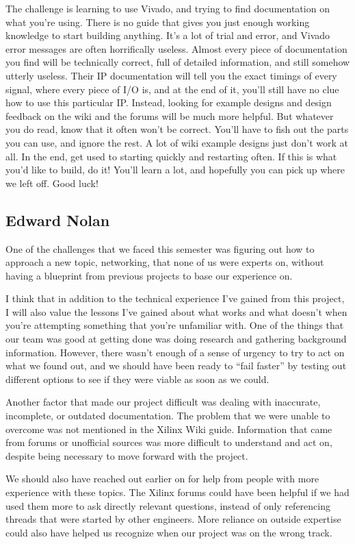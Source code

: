 \documentclass[12pt]{report}
\begin{document}
The challenge is learning to use Vivado, and trying to find documentation on what you're using. There is no guide that gives you just enough working knowledge to start building anything. It's a lot of trial and error, and Vivado error messages are often horrifically useless.
Almost every piece of documentation you find will be technically correct, full of detailed information, and still somehow utterly useless.
Their IP documentation will tell you the exact timings of every signal, where every piece of I/O is, and at the end of it, you'll still have no clue how to use this particular IP. Instead, looking for example designs and design feedback on the wiki and the forums will be much more helpful. But whatever you do read, know that it often won't be correct. You'll have to fish out the parts you can use, and ignore the rest. A lot of wiki example designs just don't work at all. In the end, get used to starting quickly and restarting often. If this is what you'd like to build, do it! You'll learn a lot, and hopefully you can pick up where we left off. Good luck!

\subsection{Edward Nolan}
One of the challenges that we faced this semester was figuring out how to approach a new topic, networking, that none of us were experts on, without having a blueprint from previous projects to base our experience on.

I think that in addition to the technical experience I've gained from this project, I will also value the lessons I've gained about what works and what doesn't when you're attempting something that you're unfamiliar with. One of the things that our team was good at getting done was doing research and gathering background information. However, there wasn't enough of a sense of urgency to try to act on what we found out, and we should have been ready to ``fail faster'' by testing out different options to see if they were viable as soon as we could.

Another factor that made our project difficult was dealing with inaccurate, incomplete, or outdated documentation. The problem that we were unable to overcome was not mentioned in the Xilinx Wiki guide. Information that came from forums or unofficial sources was more difficult to understand and act on, despite being necessary to move forward with the project.

We should also have reached out earlier on for help from people with more experience with these topics. The Xilinx forums could have been helpful if we had used them more to ask directly relevant questions, instead of only referencing threads that were started by other engineers. More reliance on outside expertise could also have helped us recognize when our project was on the wrong track.
\end{document}
